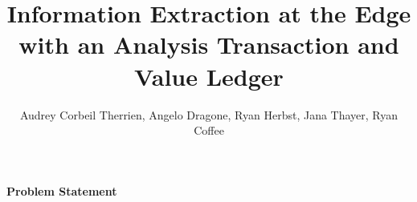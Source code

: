 \documentclass{article}
\title{Information Extraction at the Edge with an Analysis Transaction and Value Ledger}
\author{Audrey Corbeil Therrien, Angelo Dragone, Ryan Herbst, Jana Thayer, Ryan Coffee}
\begin{document}
\maketitle







\paragraph{Problem Statement}%
\end{document}
